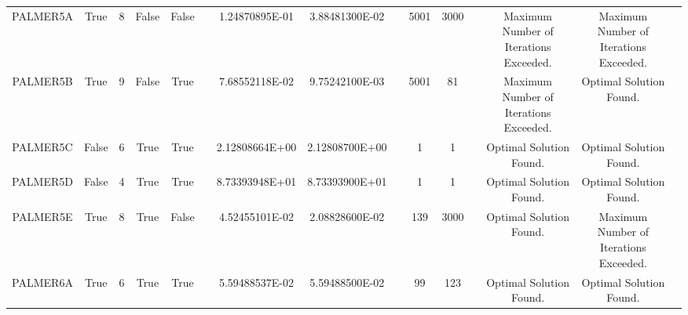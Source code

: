 \begin{longtable}{ccccccccccccccc}
	\cellcolor{default2} PALMER5A& \cellcolor{default2} True& \cellcolor{default2} 8& \cellcolor{default2} False& \cellcolor{default2} False& \cellcolor{header} & \cellcolor{poor} 1.24870895E-01& \cellcolor{best} 3.88481300E-02& \cellcolor{header} & \cellcolor{ok} 5001& \cellcolor{best} 3000& \cellcolor{header} & \cellcolor{default2} Maximum Number of Iterations Exceeded.& \cellcolor{default2} Maximum Number of Iterations Exceeded.& \cellcolor{header} \\
	\cellcolor{default1} PALMER5B& \cellcolor{default1} True& \cellcolor{default1} 9& \cellcolor{default1} False& \cellcolor{default1} True& \cellcolor{header} & \cellcolor{poor} 7.68552118E-02& \cellcolor{best} 9.75242100E-03& \cellcolor{header} & \cellcolor{poor} 5001& \cellcolor{best} 81& \cellcolor{header} & \cellcolor{default1} Maximum Number of Iterations Exceeded.& \cellcolor{default1} Optimal Solution Found.& \cellcolor{header} \\
	\cellcolor{default2} PALMER5C& \cellcolor{default2} False& \cellcolor{default2} 6& \cellcolor{default2} True& \cellcolor{default2} True& \cellcolor{header} & \cellcolor{best} 2.12808664E+00& \cellcolor{ok} 2.12808700E+00& \cellcolor{header} & \cellcolor{best} 1& \cellcolor{best} 1& \cellcolor{header} & \cellcolor{default2} Optimal Solution Found.& \cellcolor{default2} Optimal Solution Found.& \cellcolor{header} \\
	\cellcolor{default1} PALMER5D& \cellcolor{default1} False& \cellcolor{default1} 4& \cellcolor{default1} True& \cellcolor{default1} True& \cellcolor{header} & \cellcolor{ok} 8.73393948E+01& \cellcolor{best} 8.73393900E+01& \cellcolor{header} & \cellcolor{best} 1& \cellcolor{best} 1& \cellcolor{header} & \cellcolor{default1} Optimal Solution Found.& \cellcolor{default1} Optimal Solution Found.& \cellcolor{header} \\
	\cellcolor{default2} PALMER5E& \cellcolor{default2} True& \cellcolor{default2} 8& \cellcolor{default2} True& \cellcolor{default2} False& \cellcolor{header} & \cellcolor{poor} 4.52455101E-02& \cellcolor{best} 2.08828600E-02& \cellcolor{header} & \cellcolor{best} 139& \cellcolor{poor} 3000& \cellcolor{header} & \cellcolor{default2} Optimal Solution Found.& \cellcolor{default2} Maximum Number of Iterations Exceeded.& \cellcolor{header} \\
	\cellcolor{default1} PALMER6A& \cellcolor{default1} True& \cellcolor{default1} 6& \cellcolor{default1} True& \cellcolor{default1} True& \cellcolor{header} & \cellcolor{ok} 5.59488537E-02& \cellcolor{best} 5.59488500E-02& \cellcolor{header} & \cellcolor{best} 99& \cellcolor{ok} 123& \cellcolor{header} & \cellcolor{default1} Optimal Solution Found.& \cellcolor{default1} Optimal Solution Found.& \cellcolor{header} \\

\end{longtable}
